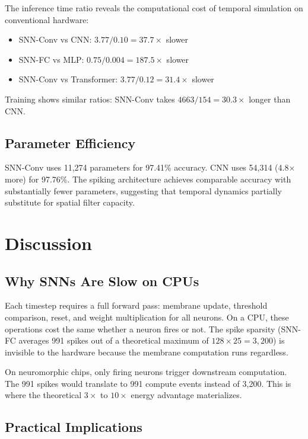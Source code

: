 \documentclass[11pt,a4paper]{article}
\begin{document}
The inference time ratio reveals the computational cost of temporal simulation on conventional hardware:

\begin{itemize}
\item SNN-Conv vs CNN: $3.77 / 0.10 = 37.7\times$ slower
\item SNN-FC vs MLP: $0.75 / 0.004 = 187.5\times$ slower
\item SNN-Conv vs Transformer: $3.77 / 0.12 = 31.4\times$ slower
\end{itemize}

Training shows similar ratios: SNN-Conv takes $4663 / 154 = 30.3\times$ longer than CNN.

\subsection{Parameter Efficiency}

SNN-Conv uses 11,274 parameters for 97.41\% accuracy. CNN uses 54,314 (4.8$\times$ more) for 97.76\%. The spiking architecture achieves comparable accuracy with substantially fewer parameters, suggesting that temporal dynamics partially substitute for spatial filter capacity.

\section{Discussion}

\subsection{Why SNNs Are Slow on CPUs}

Each timestep requires a full forward pass: membrane update, threshold comparison, reset, and weight multiplication for all neurons. On a CPU, these operations cost the same whether a neuron fires or not. The spike sparsity (SNN-FC averages 991 spikes out of a theoretical maximum of $128 \times 25 = 3,200$) is invisible to the hardware because the membrane computation runs regardless.

On neuromorphic chips, only firing neurons trigger downstream computation. The 991 spikes would translate to 991 compute events instead of 3,200. This is where the theoretical $3\times$ to $10\times$ energy advantage materializes.

\subsection{Practical Implications}
\end{document}
